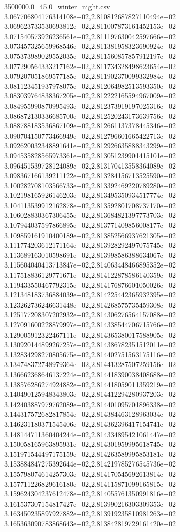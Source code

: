 \begin{filecontents*}{3500000.0_45.0_winter_night.csv}
3.067706804176314108e+02,2.810812687827110494e+02
3.069623733530693812e+02,2.811007873161452153e+02
3.071540573926236561e+02,2.811197630042597666e+02
3.073457325659968546e+02,2.811381958323690924e+02
3.075373989029552035e+02,2.811560857857912197e+02
3.077290564333217162e+02,2.811734328498623654e+02
3.079207051869577185e+02,2.811902370099332984e+02
3.081123451937978075e+02,2.812064982513593350e+02
3.083039764838367205e+02,2.812222165594967009e+02
3.084955990870995493e+02,2.812373919197025316e+02
3.086872130336685700e+02,2.812520243173639756e+02
3.088788183536867109e+02,2.812661137378445346e+02
3.090704150773466949e+02,2.812796601665422713e+02
3.092620032348891641e+02,2.812926635888343299e+02
3.094535828565973361e+02,2.813051239901415101e+02
3.096451539728124089e+02,2.813170413558364089e+02
3.098367166139211122e+02,2.813284156713525590e+02
3.100282708103566733e+02,2.813392469220789280e+02
3.102198165926146203e+02,2.813495350934517774e+02
3.104113539912162878e+02,2.813592801708737170e+02
3.106028830367306455e+02,2.813684821397773703e+02
3.107944037597866895e+02,2.813771409856008177e+02
3.109859161910400189e+02,2.813852566937621305e+02
3.111774203612171164e+02,2.813928292497075745e+02
3.113689163010598691e+02,2.813998586388634067e+02
3.115604040413713847e+02,2.814063448466895352e+02
3.117518836129771671e+02,2.814122878586140359e+02
3.119433550467792315e+02,2.814176876601050026e+02
3.121348183736884039e+02,2.814225442365932395e+02
3.123262736246631448e+02,2.814268575735459308e+02
3.125177208307202932e+02,2.814306276564157088e+02
3.127091600228879997e+02,2.814338544706715766e+02
3.129005912322467111e+02,2.814365380017588905e+02
3.130920144899267257e+02,2.814386782351512011e+02
3.132834298270805675e+02,2.814402751563175116e+02
3.134748372748979364e+02,2.814413287507259156e+02
3.136662368646137224e+02,2.814418390038408688e+02
3.138576286274924882e+02,2.814418059011359219e+02
3.140490125948343803e+02,2.814412294280937203e+02
3.142403887979762089e+02,2.814401095701896338e+02
3.144317572682817854e+02,2.814384463128963034e+02
3.146231180371545406e+02,2.814362396417154741e+02
3.148144711360404244e+02,2.814334895421061447e+02
3.150058165963895931e+02,2.814301959995618745e+02
3.151971544497175159e+02,2.814263589995853181e+02
3.153884847275392644e+02,2.814219785276545736e+02
3.155798074614257303e+02,2.814170545692613814e+02
3.157711226829616180e+02,2.814115871099165815e+02
3.159624304237612478e+02,2.814055761350991816e+02
3.161537307154817427e+02,2.813990216303309353e+02
3.163450235897927882e+02,2.813919235810981263e+02
3.165363090783868643e+02,2.813842819729161420e+02

\end{filecontents*}
